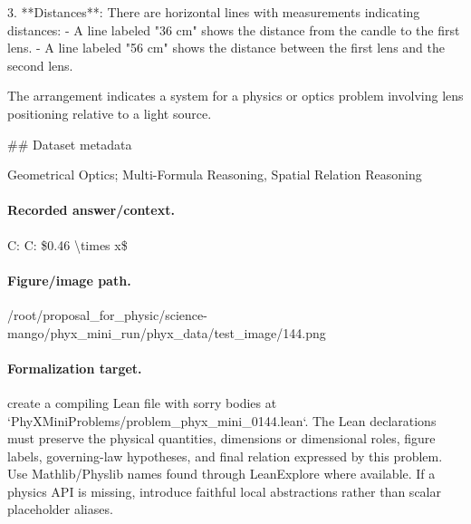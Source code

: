 3. **Distances**: There are horizontal lines with measurements indicating distances:
   - A line labeled "36 cm" shows the distance from the candle to the first lens.
   - A line labeled "56 cm" shows the distance between the first lens and the second lens.

The arrangement indicates a system for a physics or optics problem involving lens positioning relative to a light source.

\#\# Dataset metadata

Geometrical Optics; Multi-Formula Reasoning, Spatial Relation Reasoning

\paragraph{Recorded answer/context.}
C: C: \$0.46 \textbackslash{}times x\$

\paragraph{Figure/image path.}
/root/proposal\_for\_physic/science-mango/phyx\_mini\_run/phyx\_data/test\_image/144.png

\paragraph{Formalization target.}
create a compiling Lean file with sorry bodies at `PhyXMiniProblems/problem\_phyx\_mini\_0144.lean`. The Lean declarations must preserve the physical quantities, dimensions or dimensional roles, figure labels, governing-law hypotheses, and final relation expressed by this problem.
Use Mathlib/Physlib names found through LeanExplore where available. If a physics API is missing, introduce faithful local abstractions rather than scalar placeholder aliases.

